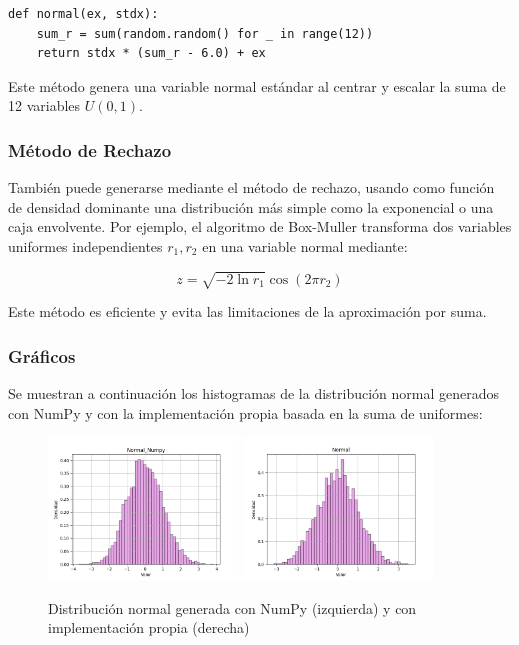 \documentclass{article}
\begin{document}
\begin{verbatim}
def normal(ex, stdx):
    sum_r = sum(random.random() for _ in range(12))
    return stdx * (sum_r - 6.0) + ex
\end{verbatim}

Este método genera una variable normal estándar al centrar y escalar la suma de 12 variables \( U(0,1) \).

\subsubsection{Método de Rechazo}
También puede generarse mediante el método de rechazo, usando como función de densidad dominante una distribución más simple como la exponencial o una caja envolvente. Por ejemplo, el algoritmo de Box-Muller transforma dos variables uniformes independientes \( r_1, r_2 \) en una variable normal mediante:

\[
z = \sqrt{-2 \ln r_1} \cos(2\pi r_2)
\]

Este método es eficiente y evita las limitaciones de la aproximación por suma.

\subsubsection{Gráficos}
Se muestran a continuación los histogramas de la distribución normal generados con NumPy y con la implementación propia basada en la suma de uniformes:

\begin{figure}[H]
    \centering
    \includegraphics[width=0.45\textwidth]{Imagenes/Distribucion_Normal_Numpy.png}
    \includegraphics[width=0.45\textwidth]{Imagenes/Distribucion_Normal.png}
    \caption{Distribución normal generada con NumPy (izquierda) y con implementación propia (derecha)}
    \label{fig:normal}
\end{figure}
\end{document}
